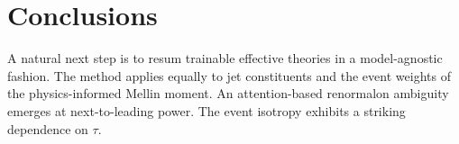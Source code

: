\section{Conclusions}\label{sec:conclusions}

A natural next step is to resum trainable effective theories in a
model-agnostic fashion. The method applies equally to jet constituents
and the event weights of the physics-informed Mellin moment. An
attention-based renormalon ambiguity emerges at next-to-leading power.
The event isotropy exhibits a striking dependence on $\tau$.

